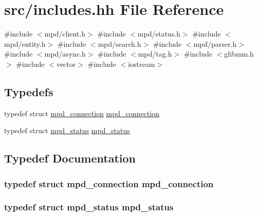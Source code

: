 \hypertarget{includes_8hh}{
\section{src/includes.hh \-File \-Reference}
\label{includes_8hh}
}
{\ttfamily \#include $<$mpd/client.\-h$>$}\*
{\ttfamily \#include $<$mpd/status.\-h$>$}\*
{\ttfamily \#include $<$mpd/entity.\-h$>$}\*
{\ttfamily \#include $<$mpd/search.\-h$>$}\*
{\ttfamily \#include $<$mpd/parser.\-h$>$}\*
{\ttfamily \#include $<$mpd/async.\-h$>$}\*
{\ttfamily \#include $<$mpd/tag.\-h$>$}\*
{\ttfamily \#include $<$glibmm.\-h$>$}\*
{\ttfamily \#include $<$vector$>$}\*
{\ttfamily \#include $<$iostream$>$}\*
\subsection*{\-Typedefs}
\begin{DoxyCompactItemize}
\item 
typedef struct \hyperlink{includes_8hh_a83791b93fccbeae334f6cd9d4201e024}{mpd\-\_\-connection} \hyperlink{includes_8hh_a83791b93fccbeae334f6cd9d4201e024}{mpd\-\_\-connection}
\item 
typedef struct \hyperlink{includes_8hh_aa4e550b6c71adee68fe89a4b802a7c50}{mpd\-\_\-status} \hyperlink{includes_8hh_aa4e550b6c71adee68fe89a4b802a7c50}{mpd\-\_\-status}
\end{DoxyCompactItemize}


\subsection{\-Typedef \-Documentation}
\hypertarget{includes_8hh_a83791b93fccbeae334f6cd9d4201e024}{
\subsubsection[{mpd\-\_\-connection}]{\setlength{\rightskip}{0pt plus 5cm}typedef struct {\bf mpd\-\_\-connection} {\bf mpd\-\_\-connection}}}
\label{includes_8hh_a83791b93fccbeae334f6cd9d4201e024}
\hypertarget{includes_8hh_aa4e550b6c71adee68fe89a4b802a7c50}{
\subsubsection[{mpd\-\_\-status}]{\setlength{\rightskip}{0pt plus 5cm}typedef struct {\bf mpd\-\_\-status} {\bf mpd\-\_\-status}}}
\label{includes_8hh_aa4e550b6c71adee68fe89a4b802a7c50}
